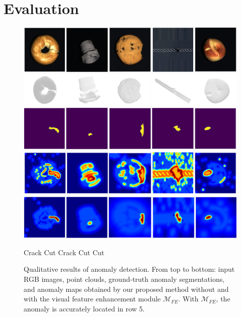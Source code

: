 \section*{Evaluation}
\label{sec:evaluation}

\begin{figure}[ht]
\centering
\includegraphics[width=0.9\linewidth]{figs/result_rgb}
\includegraphics[width=0.9\linewidth]{figs/result_pc}
\includegraphics[width=0.9\linewidth]{figs/result_gt}
\includegraphics[width=0.9\linewidth]{figs/result_baseline}
\includegraphics[width=0.9\linewidth]{figs/result_ours}
\vspace{-0.2cm}

\begin{flushleft}
 \hspace{1.5cm} Crack \hspace{2.6cm} Cut  \hspace{2.6cm} Crack  \hspace{2.5cm} Cut  \hspace{2.3cm} Cut
 \end{flushleft}
 
 \vspace{-0.1cm}
\caption{Qualitative results of anomaly detection. From top to bottom: input RGB images, point clouds, ground-truth anomaly segmentations, and anomaly maps obtained by our proposed method without and with the visual feature enhancement module $\mathcal{M}_{FE}$. With $\mathcal{M}_{FE}$, the anomaly is accurately located in row 5.}
\label{fig:results1}
\end{figure}

